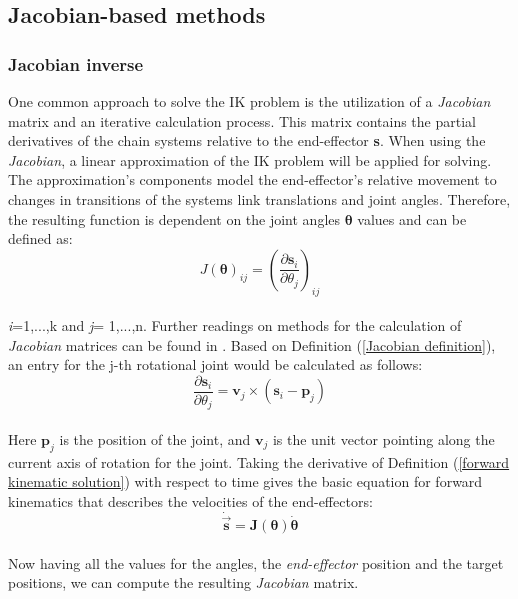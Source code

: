 \subsection{Jacobian-based methods}
\subsubsection{Jacobian inverse}
One common approach to solve the IK problem is the utilization of a \textit{Jacobian} matrix and an iterative calculation process. This matrix contains the partial derivatives of the chain systems relative to the end-effector \textbf{s}. When using the \textit{Jacobian}, a linear approximation  of the IK problem will be applied for solving. The approximation's components model the end-effector's relative movement to changes in transitions of the systems link translations and joint angles. Therefore, the resulting function is dependent on the joint angles $\pmb{\theta}$ values and can be defined as:\\
\begin{equation}
\label{Jacobian definition}
J(\pmb{\theta})_{ij}=\left(\frac{\partial\textbf{s}_{i}}{\partial\theta_{j}}\right)_{ij}
\end{equation}
\\ \textit{i}=1,...,k and \textit{j}= 1,...,n.
Further readings on methods for the calculation of \textit{Jacobian} matrices can be found in \cite{Orin.1984}. Based on Definition (\ref{Jacobian definition}), an entry for the j-th rotational joint would be calculated as follows:\\
\begin{equation}
\label{Jacobian entry calc}
\frac{\partial \textbf{s}_{i}}{\partial \theta_{j}}= \textbf{v}_{j}\times(\textbf{s}_{i}-\textbf{p}_{j})
\end{equation}
\\Here $\textbf{p}_{j}$ is the position of the joint, and $\textbf{v}_{j}$ is the unit vector pointing along the current axis of rotation for the joint.
Taking the derivative of Definition (\ref{forward kinematic solution}) with respect to time gives the basic equation for forward kinematics that describes the velocities of the end-effectors:
\begin{equation}
\label{fk derivate}
\dot{\vec{\pmb{s}}}=\pmb{J}\pmb{(\theta)}\dot{\pmb{\theta}}
\end{equation}
\\ Now having all the values for the angles, the \textit{end-effector} position and the target positions, we can compute the resulting \textit{Jacobian} matrix.
